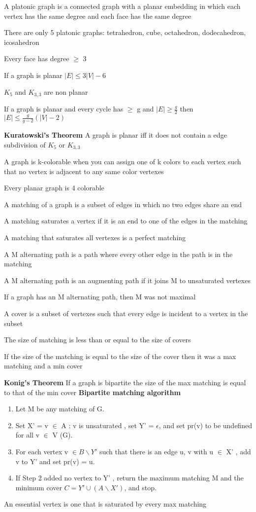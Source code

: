 \documentclass[12pt]{article}
\begin{document}
A platonic graph is a connected graph with a planar embedding in which each vertex has the same degree and each face has the same degree

There are only 5 platonic graphs: tetrahedron, cube, octahedron, dodecahedron, icosahedron

Every face has degree $\geq$ 3

If a graph is planar $|E| \leq 3|V| - 6$

$K_5$ and $K_{3,3}$ are non planar

If a graph is planar and every cycle has $\geq$ g and $|E| \geq \frac{g}{2}$ then $|E| \leq \frac{g}{g-2}(|V|-2)$

\textbf{Kuratowski's Theorem}
A graph is planar iff it does not contain a edge subdivision of $K_5$ or $K_{3,3}$

A graph is k-colorable when you can assign one of k colors to each vertex such that no vertex is adjacent to any same color vertexes

Every planar graph is 4 colorable

A matching of a graph is a subset of edges in which no two edges share an end

A matching saturates a vertex if it is an end to one of the edges in the matching

A matching that saturates all vertexes is a perfect matching

A M alternating path is a path where every other edge in the path is in the matching

A M alternating path is an augmenting path if it joins M to unsaturated vertexes

If a graph has an M alternating path, then M was not maximal

A cover is a subset of vertexes such that every edge is incident to a vertex in the subset

The size of matching is less than or equal to the size of covers

If the size of the  matching is equal to the size of the cover then it was a max matching and a min cover

\textbf{Konig's Theorem}
If a graph is bipartite the size of the max matching is equal to that of the min cover
\textbf{Bipartite matching algorithm}
\begin{enumerate}
    \item Let M be any matching of G.
    \item Set X' = {v $\in$ A : v is unsaturated }, set Y' = $\epsilon$, and set pr(v) to be undefined for all v $\in$ V (G).
    \item For each vertex v $\in B \backslash Y'$ such that there is an edge {u, v} with u $\in$ X' , add v to Y' and set pr(v) = u.
    \item If Step 2 added no vertex to Y' , return the maximum matching M and the minimum cover $C = Y' \cup (A \backslash X' )$, and stop.
\end{enumerate}
An essential vertex is one that is saturated by every max matching
\end{document}
